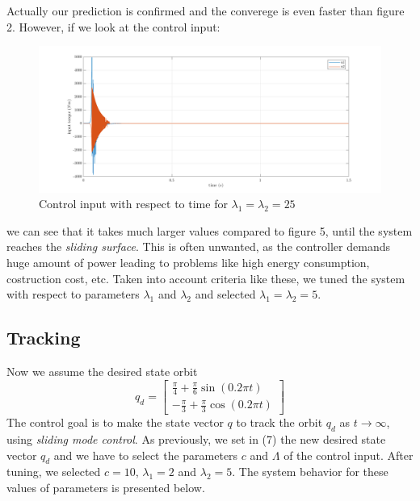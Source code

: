 \documentclass[a4paper]{article}
\begin{document}
\noindent\hspace{-2pt}
Actually our prediction is confirmed and the converege is even faster than figure 2. However, if we look at the control input: 
\begin{figure}[H]
    \centering
    \includegraphics[width=15cm]{fig/sim1/u25.png}
    \caption{Control input with respect to time for $\lambda_1 = \lambda_2 = 25$}
\end{figure}

\noindent\hspace{-2pt}
we can see that it takes much larger values compared to figure 5, until the system reaches the \textit{sliding surface}. This is often 
unwanted, as the controller demands huge amount of power leading to problems like high energy consumption, costruction cost, etc.
Taken into account criteria like these, we tuned the system with respect to parameters $\lambda_1$ and $ \lambda_2$ and selected 
$\lambda_1 = \lambda_2 = 5$.

\subsection{Tracking}
Now we assume the desired state orbit
$$
    q_d = \begin{bmatrix}
        \frac{\pi}{4} + \frac{\pi}{6} \sin (0.2 \pi t)\\
        -\frac{\pi}{3} + \frac{\pi}{3} \cos (0.2 \pi t)
    \end{bmatrix}
$$
The control goal is to make the state vector $q$ to track the orbit $q_d$ as $t \rightarrow \infty$, 
using \textit{sliding mode control}. As previously, we set in (7) the new desired state vector $q_d$ 
and we have to select the parameters $c$ and $\Lambda$ of the control input. After tuning, we selected 
$c=10$, $\lambda_1 = 2$ and $\lambda_2 = 5$. The system behavior for these values of parameters is presented 
below.
\end{document}
